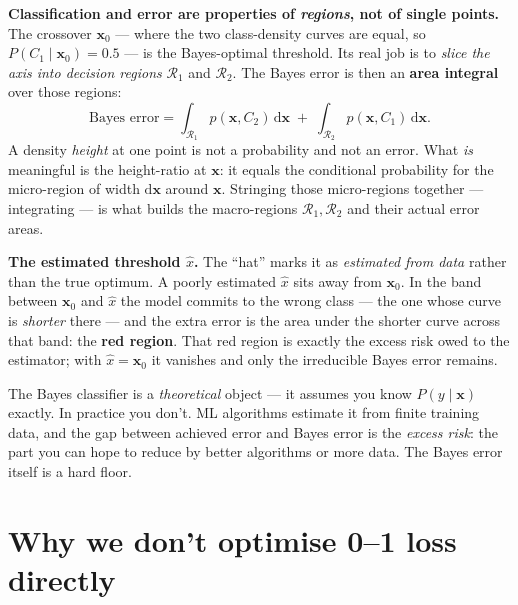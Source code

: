 \documentclass[11pt, a4paper]{article}
\begin{document}
\begin{notebox}
\textbf{Classification and error are properties of \emph{regions}, not of single points.} The crossover $\mathbf{x}_0$ — where the two class-density curves are equal, so $P(C_1 \mid \mathbf{x}_0) = 0.5$ — is the Bayes-optimal threshold. Its real job is to \emph{slice the axis into decision regions} $\mathcal{R}_1$ and $\mathcal{R}_2$. The Bayes error is then an \textbf{area integral} over those regions:
\[
\text{Bayes error} = \int_{\mathcal{R}_1} p(\mathbf{x}, C_2)\,\mathrm{d}\mathbf{x} \;+\; \int_{\mathcal{R}_2} p(\mathbf{x}, C_1)\,\mathrm{d}\mathbf{x}.
\]
A density \emph{height} at one point is not a probability and not an error. What \emph{is} meaningful is the height-ratio at $\mathbf{x}$: it equals the conditional probability for the micro-region of width $\mathrm{d}\mathbf{x}$ around $\mathbf{x}$. Stringing those micro-regions together — integrating — is what builds the macro-regions $\mathcal{R}_1, \mathcal{R}_2$ and their actual error areas.

\textbf{The estimated threshold $\hat{x}$.} The ``hat'' marks it as \emph{estimated from data} rather than the true optimum. A poorly estimated $\hat{x}$ sits away from $\mathbf{x}_0$. In the band between $\mathbf{x}_0$ and $\hat{x}$ the model commits to the wrong class — the one whose curve is \emph{shorter} there — and the extra error is the area under the shorter curve across that band: the \textbf{red region}. That red region is exactly the excess risk owed to the estimator; with $\hat{x} = \mathbf{x}_0$ it vanishes and only the irreducible Bayes error remains.
\end{notebox}

\begin{pitfallbox}
The Bayes classifier is a \emph{theoretical} object — it assumes you know $P(y \mid \mathbf{x})$ exactly. In practice you don't. ML algorithms estimate it from finite training data, and the gap between achieved error and Bayes error is the \emph{excess risk}: the part you can hope to reduce by better algorithms or more data. The Bayes error itself is a hard floor.
\end{pitfallbox}

\section{Why we don't optimise 0--1 loss directly}
\end{document}
